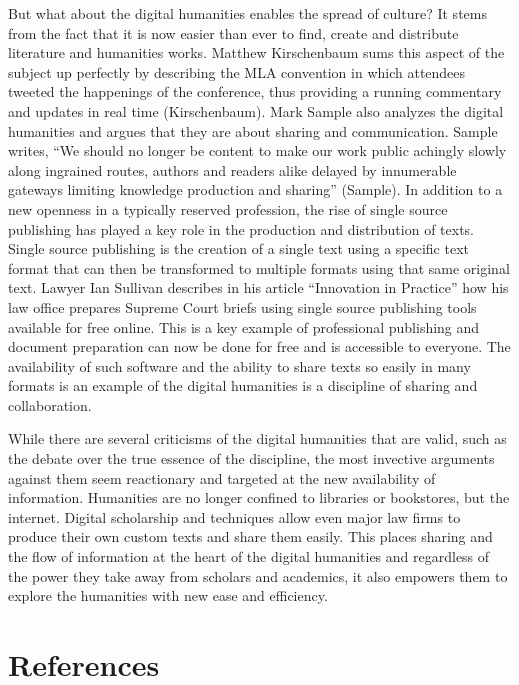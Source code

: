 \documentclass[]{article}
\begin{document}
But what about the digital humanities enables the spread of culture? It
stems from the fact that it is now easier than ever to find, create and
distribute literature and humanities works. Matthew Kirschenbaum sums
this aspect of the subject up perfectly by describing the MLA convention
in which attendees tweeted the happenings of the conference, thus
providing a running commentary and updates in real time (Kirschenbaum).
Mark Sample also analyzes the digital humanities and argues that they
are about sharing and communication. Sample writes, ``We should no
longer be content to make our work public achingly slowly along
ingrained routes, authors and readers alike delayed by innumerable
gateways limiting knowledge production and sharing'' (Sample). In
addition to a new openness in a typically reserved profession, the rise
of single source publishing has played a key role in the production and
distribution of texts. Single source publishing is the creation of a
single text using a specific text format that can then be transformed to
multiple formats using that same original text. Lawyer Ian Sullivan
describes in his article ``Innovation in Practice'' how his law office
prepares Supreme Court briefs using single source publishing tools
available for free online. This is a key example of professional
publishing and document preparation can now be done for free and is
accessible to everyone. The availability of such software and the
ability to share texts so easily in many formats is an example of the
digital humanities is a discipline of sharing and collaboration.

While there are several criticisms of the digital humanities that are
valid, such as the debate over the true essence of the discipline, the
most invective arguments against them seem reactionary and targeted at
the new availability of information. Humanities are no longer confined
to libraries or bookstores, but the internet. Digital scholarship and
techniques allow even major law firms to produce their own custom texts
and share them easily. This places sharing and the flow of information
at the heart of the digital humanities and regardless of the power they
take away from scholars and academics, it also empowers them to explore
the humanities with new ease and efficiency.

\section*{References}\label{references}
\end{document}
